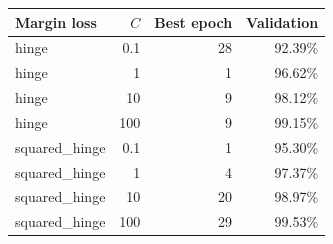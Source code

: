 \begin{center}\begin{tabular}{lrrr}
\toprule
Margin loss & $C$ & Best epoch & Validation \\\midrule
hinge & 0.1 & 28 & 92.39\% \\
hinge & 1 & 1 & 96.62\% \\
hinge & 10 & 9 & 98.12\% \\
hinge & 100 & 9 & 99.15\% \\
squared\_hinge & 0.1 & 1 & 95.30\% \\
squared\_hinge & 1 & 4 & 97.37\% \\
squared\_hinge & 10 & 20 & 98.97\% \\
squared\_hinge & 100 & 29 & 99.53\% \\
\bottomrule\end{tabular}\end{center}
